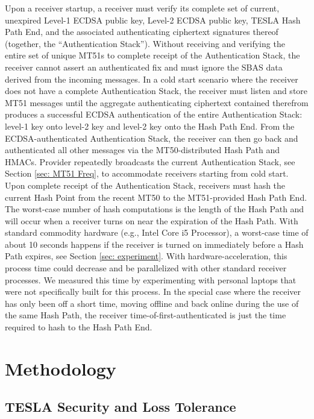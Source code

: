 \documentclass[letterpaper,times]{IONconf/IONconf}
\begin{document}
Upon a receiver startup, a receiver must verify its complete set of current, unexpired Level-1 ECDSA public key, Level-2 ECDSA public key, TESLA Hash Path End, and the associated authenticating ciphertext signatures thereof (together, the ``Authentication Stack'').
Without receiving and verifying the entire set of unique MT51s to complete receipt of the Authentication Stack, the receiver cannot assert an authenticated fix and must ignore the SBAS data derived from the incoming messages.
In a cold start scenario where the receiver does not have a complete Authentication Stack, the receiver must listen and store MT51 messages until the aggregate authenticating ciphertext contained therefrom produces a successful ECDSA authentication of the entire Authentication Stack: level-1 key onto level-2 key and level-2 key onto the Hash Path End.
From the ECDSA-authenticated Authentication Stack, the receiver can then go back and authenticated all other messages via the MT50-distributed Hash Path and HMACs.
Provider repeatedly broadcasts the current Authentication Stack, see Section \ref{sec: MT51 Freq}, to accommodate receivers starting from cold start.
Upon complete receipt of the Authentication Stack, receivers must hash the current Hash Point from the recent MT50 to the MT51-provided Hash Path End.
The worst-case number of hash computations is the length of the Hash Path and will occur when a receiver turns on near the expiration of the Hash Path.
With standard commodity hardware (e.g., Intel Core i5 Processor), a worst-case time of about 10 seconds happens if the receiver is turned on immediately before a Hash Path expires, see Section \ref{sec: experiment}.
With hardware-acceleration, this process time could decrease and be parallelized with other standard receiver processes.
We measured this time by experimenting with personal laptops that were not specifically built for this process.
In the special case where the receiver has only been off a short time, moving offline and back online during the use of the same Hash Path, the receiver time-of-first-authenticated is just the time required to hash to the Hash Path End.

\section{Methodology} \label{sec: methodology}

\subsection{TESLA Security and Loss Tolerance}
\end{document}
